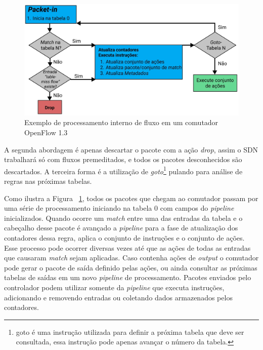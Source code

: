 \begin{figure}[!htb]
	\caption{\label{fig:pipeline} Exemplo de processamento interno de fluxo em um comutador OpenFlow 1.3}
	\begin{center}
	    \includegraphics[scale=0.45]{imagens/pipeline.jpg}
	\end{center}
\end{figure}

 A segunda abordagem é apenas descartar o pacote com a ação \textit{drop}, assim o SDN trabalhará só com fluxos premeditados, e todos os pacotes desconhecidos são descartados. A terceira forma é a utilização de \textit{goto}\footnote{goto é uma instrução utilizada para definir a próxima tabela que deve ser consultada, essa instrução pode apenas avançar o número da tabela.} pulando para análise de regras nas próximas tabelas.


Como ilustra a Figura ~\ref{fig:pipeline}, todos os pacotes que chegam ao comutador passam por uma série de processamento iniciando na tabela 0 com campos do \textit{pipeline} inicializados. Quando ocorre um \textit{match} entre uma das entradas da tabela e o cabeçalho desse pacote é avançado a \textit{pipeline} para a fase de atualização dos contadores dessa regra, aplica o conjunto de instruções e o conjunto de ações. Esse processo pode ocorrer diversas vezes até que as ações de todas as entradas que causaram \textit{match} sejam aplicadas. Caso contenha ações de \textit{output} o comutador pode gerar o pacote de saída definido pelas ações, ou ainda consultar as próximas tabelas de saídas em um novo \textit{pipeline} de processamento. Pacotes enviados pelo controlador podem utilizar somente da \textit{pipeline} que executa instruções, adicionando e removendo entradas ou coletando dados armazenados pelos contadores.


